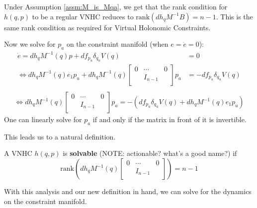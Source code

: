 Under Assumption \ref{assm:M_is_Mqa}, we get that the rank condition for \(h(q,p)\) to be a regular VNHC reduces to \(\text{rank}\left(dh_q M^{-1} B\right) = n - 1\). This is the same rank condition as required for Virtual Holonomic Constraints.

Now we solve for \(p_a\) on the constraint manifold (when \(e = \dot{e} = 0\)):
\begin{align*}
    \dot{e} = dh_q M^{-1}(q)p + df_{p_u} \delta_{q_u}V(q) &= 0\\
    \Leftrightarrow dh_q M^{-1}(q)e_1 p_u + dh_q M^{-1}(q) \begin{bmatrix}
    0 & \cdots & 0 \\
    & I_{n-1} & \\
    \end{bmatrix} p_a &= -df_{p_u} \delta_{q_u}V(q) \\
\end{align*}
\begin{align*}
    \Leftrightarrow dh_q M^{-1}(q) \begin{bmatrix}
    0 & \cdots & 0 \\
    & I_{n-1} & \\
    \end{bmatrix} p_a = -\left(df_{p_u}\delta_{q_u}V(q) + dh_q M^{-1}(q)e_1 p_u\right)
\end{align*}
One can linearly solve for \(p_a\) if and only if the matrix in front of it is invertible.

This leads us to a natural definition.
\begin{defn}\label{defn:solvability}
A VNHC \(h(q,p)\) is \textbf{solvable} (NOTE: actionable? what's a good name?) if
\[
\text{rank}\left(dh_q M^{-1}(q) \begin{bmatrix}
    0 & \cdots & 0 \\
    & I_{n-1} & \\
    \end{bmatrix}\right) = n - 1
\]
\end{defn}

With this analysis and our new definition in hand, we can solve for the dynamics on the constraint manifold.

